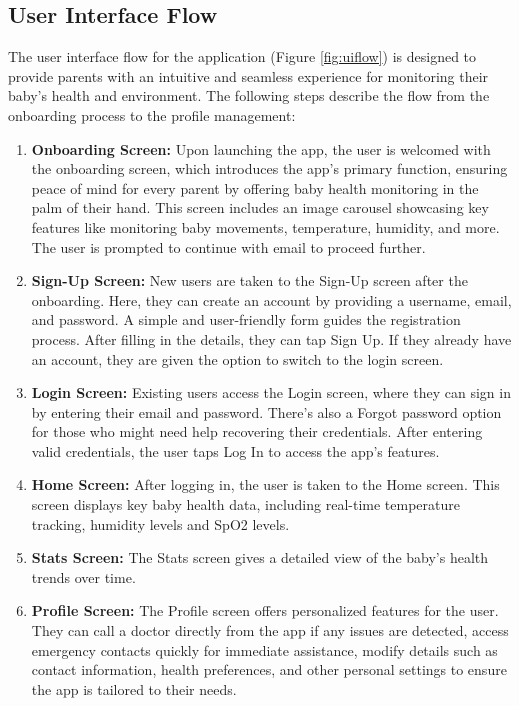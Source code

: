 \documentclass[12pt,a4paper]{report}
\begin{document}
\subsection{User Interface Flow}
The user interface flow for the application (Figure \ref{fig:uiflow}) is designed to provide parents with an intuitive and seamless experience for monitoring their baby's health and environment. The following steps describe the flow from the onboarding process to the profile management:
\begin{enumerate}
  \item \textbf{Onboarding Screen:} Upon launching the app, the user is welcomed with the onboarding screen, which introduces the app’s primary function, ensuring peace of mind for every parent by offering baby health monitoring in the palm of their hand. This screen includes an image carousel showcasing key features like monitoring baby movements, temperature, humidity, and more. The user is prompted to continue with email to proceed further.
  \item \textbf{Sign-Up Screen:} New users are taken to the Sign-Up screen after the onboarding. Here, they can create an account by providing a username, email, and password. A simple and user-friendly form guides the registration process. After filling in the details, they can tap Sign Up. If they already have an account, they are given the option to switch to the login screen.
  \item \textbf{Login Screen:} Existing users access the Login screen, where they can sign in by entering their email and password. There’s also a Forgot password option for those who might need help recovering their credentials. After entering valid credentials, the user taps Log In to access the app’s features.
  \item \textbf{Home Screen:} After logging in, the user is taken to the Home screen. This screen displays key baby health data, including real-time temperature tracking, humidity levels and SpO2 levels.
  \item \textbf{Stats Screen:} The Stats screen gives a detailed view of the baby’s health trends over time.
  \item \textbf{Profile Screen:} The Profile screen offers personalized features for the user. They can call a doctor directly from the app if any issues are detected, access emergency contacts quickly for immediate assistance, modify details such as contact information, health preferences, and other personal settings to ensure the app is tailored to their needs.
\end{enumerate}
\end{document}
